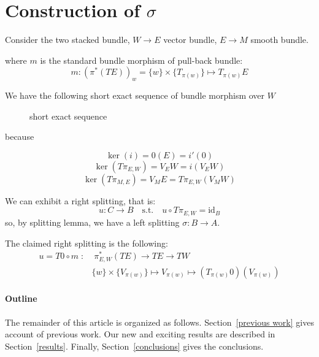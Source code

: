 \documentclass[a4paper,12pt]{scrartcl}  %
\begin{document}
\section{Construction of $\sigma$}
Consider the two stacked bundle, $ W \rightarrow E$ vector bundle, $E \rightarrow M$ smooth bundle.

where $m$ is the standard bundle morphism of pull-back bundle:
\begin{displaymath}
	m : \left( \pi^\ast \left( T E \right) \right)_w = \{w\} \times \{T_{\pi(w)} \} \mapsto T_{\pi(w)} E
\end{displaymath}

\begin{figure}
  \centering
  
\end{figure}

We have the following short exact sequence of bundle morphism over $W$
\begin{figure}
  \centering
  \caption{short exact sequence}
\end{figure}
because

\begin{displaymath}
	\ker(i) = 0 (E) = i' \left( 0 \right)
\end{displaymath}
\begin{displaymath}
	\ker\left( T \pi_{E,W} \right) = V_E W = i\left( V_E W \right)
\end{displaymath}
\begin{displaymath}
	\ker\left(T \pi_{M,E}\right) = V_M E = T \pi_{E,W} \left( V_M W \right)
\end{displaymath}

We can exhibit a right splitting, that is:
\begin{displaymath}
	u : C \rightarrow B \quad \textrm{s.t.} \quad u \circ T \pi_{E,W} = \textrm{id}_B
\end{displaymath}
so, by splitting lemma, we have a left splitting $\sigma : B \rightarrow A$.

The claimed right splitting is the following:
\begin{align*}
		u = T0 \circ m \; : & \; \pi^\ast_{E,W} \left(TE \right) \rightarrow TE \rightarrow TW \\
						& \{w\} \times \{V_{\pi(w)} \} \mapsto V_{\pi(w)} \mapsto \left( T_{\pi(w)}0\right) (V_{\pi(w)})
\end{align*}



\paragraph{Outline}
The remainder of this article is organized as follows.
Section~\ref{previous work} gives account of previous work.
Our new and exciting results are described in Section~\ref{results}.
Finally, Section~\ref{conclusions} gives the conclusions.
\end{document}
